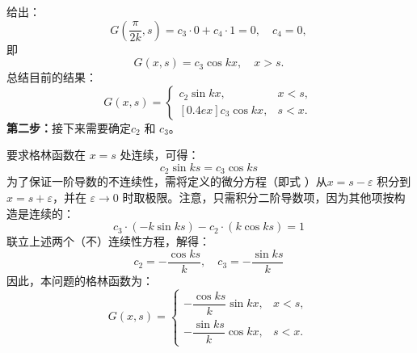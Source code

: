 给出：
$$
G\left(\frac{\pi}{2k},s\right) = c_3 \cdot 0 + c_4 \cdot 1 = 0,
\quad c_4 = 0,~
$$
即
$$
G(x,s) = c_3 \cos kx, \quad x > s.~
$$
总结目前的结果：
$$
G(x,s) = 
\begin{cases}
c_2 \sin kx, & x < s, \\
[0.4ex]
c_3 \cos kx, & s < x.
\end{cases}~
$$
\textbf{第二步：}接下来需要确定$c_{2}$ 和 $c_{3}$。

要求格林函数在 $x = s$ 处连续，可得：
$$
c_{2} \sin ks = c_{3} \cos ks~
$$
为了保证一阶导数的不连续性，需将定义的微分方程（即式 \*）从$x = s - \varepsilon$ 积分到 $x = s + \varepsilon$，并在 $\varepsilon \to 0$ 时取极限。注意，只需积分二阶导数项，因为其他项按构造是连续的：
$$
c_{3} \cdot (-k \sin ks) - c_{2} \cdot (k \cos ks) = 1~
$$
联立上述两个（不）连续性方程，解得：
$$
c_{2} = -\frac{\cos ks}{k}, 
\quad 
c_{3} = -\frac{\sin ks}{k}~
$$
因此，本问题的格林函数为：
$$
G(x,s) = 
\begin{cases}
-\dfrac{\cos ks}{k} \sin kx, & x < s, \\
-\dfrac{\sin ks}{k} \cos kx, & s < x.
\end{cases}~
$$

